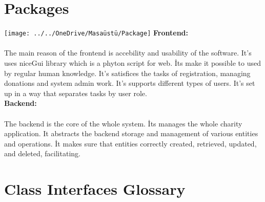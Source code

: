 \documentclass[a4paper,12pt]{report}
\begin{document}
		\section{Packages}
			\texttt{[image: ../../OneDrive/Masaüstü/Package]}
		\textbf{Frontend:}
		
			\paragraph{  }  The main reason of the frontend is accebility and usability of the software. It's uses niceGui library which is a phyton script for web. İts make it possible to used by regular human knowledge. It's satisfices the tasks of registration, managing donations and system admin work. It's supports different types of users. It's set up in a way that separates tasks by user role.  \\
			
				\textbf{Backend:}
					\paragraph{ } The backend is the core of the whole system. İts manages the whole charity application. It abstracts the backend storage and management of various entities and operations. İt makes sure that entities correctly created, retrieved, updated, and deleted, facilitating. 
				
		
		\section{Class Interfaces Glossary}
		
\end{document}

